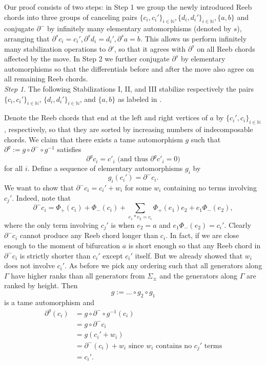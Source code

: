 \documentclass[11pt]{amsart}
\makeatletter
\renewenvironment{proof}[1][\proofname] {\par\pushQED{\qed}{\normalfont\bfseries\topsep6\p@\@plus6\p@\relax #1\@addpunct{.} }}{\popQED\endtrivlist\@endpefalse}
\theoremstyle{mystyle}
\newcommand{\<}{\langle}
\renewcommand{\>}{\rangle}
\makeatother
\begin{document}
\begin{proof}
    Our proof consists of two steps: in Step 1 we group the newly introduced Reeb chords into three groups of canceling pairs $\{c_i, c_i'\}_{i \in \mathbb{N}}, \{d_i, d_i'\}_{i \in \mathbb{N}}, \{a, b\}$ and conjugate $\partial^-$ by infinitely many elementary automorphisms (denoted by $s$), arranging that $\partial^s c_i = c_i', \partial^s d_i = d_i', \partial^s a = b$. This allows us perform infinitely many stabilization operations to $\partial'$, so that it agrees with $\partial^s$ on all Reeb chords affected by the move. In Step 2 we further conjugate $\partial^s$ by elementary automorphisms so that the differentials before and after the move also agree on all remaining Reeb chords. \\
    
    \textit{Step 1}. The following Stabilizations I, II, and III  stabilize respectively the pairs $\{c_i, c_i'\}_{i \in \mathbb{N}}$, $\{d_i, d_i'\}_{i \in \mathbb{N}}$, and $\{a, b\}$ as labeled in .

    

    
	  
	Denote the Reeb chords that end at the left and right vertices of $a$ by $\{c_i', c_i\}_{i \in \mathbb{N}}$, respectively, so that they are sorted by increasing numbers of indecomposable chords. We claim that there exists a tame automorphism $g$ such that $\partial^g := g \circ \partial^- \circ g^{-1}$ satisfies \[\partial^g c_i = c'_i \text{ (and thus } \partial^g c'_i = 0)\] for all $i$. Define a sequence of elementary automorphisms $g_i$ by \[g_{i}(c_{i}') = \partial^- c_{i}.\] We want to show that $\partial^- c_{i} =  c_i' + w_i$ for some $w_i$ containing no terms involving $c_j'$. Indeed, note that \[\partial^- c_{i} = \Phi_+(c_{i}) + \Phi_-(c_{i}) + \sum_{e_1 * e_2 = c_{i}} \Phi_+(e_1)e_2 + e_1\Phi_-(e_2),\] where the only term involving $c_j'$ is when $e_2 = a$ and $e_1\Phi_-(e_2) = c_{i}'$. Clearly $\partial^- c_i$ cannot produce any Reeb chord longer than $c_i$. In fact, if we are close enough to the moment of bifurcation $a$ is short enough so that any Reeb chord in $\partial^- c_i$ is strictly shorter than $c_i'$ except $c_i'$ itself. But we already showed that $w_i$ does not involve $c_i'$. As before we pick any ordering such that all generators along $\Gamma$ have higher ranks than all generators from $\Sigma_\pm$ and the generators along $\Gamma$ are ranked by height. Then \[g := \dots  \circ g_2 \circ g_1\] is a tame automorphism and \begin{align*}
		\partial^g(c_i) &= g \circ \partial^- \circ g^{-1} (c_i) \\
		&= g \circ \partial^- c_i \\
		&= g(c_i' + w_i) \\
		&= \partial^-(c_i)+ w_i \text{ since } w_i \text{ contains no } c_j' \text{ terms} \\
		&= c_i'.
	\end{align*}


\end{proof}
\end{document}
